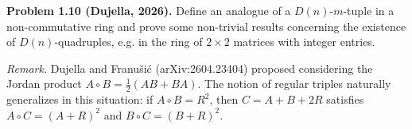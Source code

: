 \textbf{Problem 1.10 (Dujella, 2026).} Define an analogue of a $D(n)$-$m$-tuple in a non-commutative ring and prove some non-trivial results concerning the existence of $D(n)$-quadruples, e.g. in the ring of $2\times 2$ matrices with integer entries.

\medskip

\textit{Remark.} Dujella and Franušić (arXiv:2604.23404) proposed considering the Jordan product $A \circ B = \frac{1}{2}(AB+BA)$. The notion of regular triples naturally generalizes in this situation: if $A \circ B = R^2$, then $C = A+B+2R$ satisfies $A \circ C = (A+R)^2$ and $B \circ C = (B+R)^2$.
